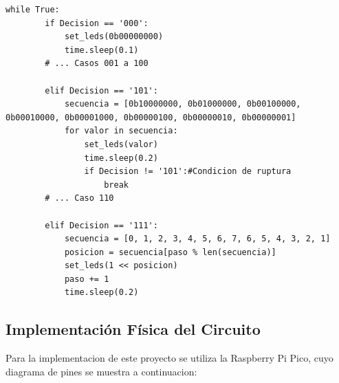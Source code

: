 \documentclass[letterpaper,12pt]{article}
\begin{document}
    \begin{lstlisting}[language={[LAB]Python}, caption={Lógica de control del ciclo principal y casos principales de cada categoría}]
    while True:
        if Decision == '000':
            set_leds(0b00000000)
            time.sleep(0.1)
        # ... Casos 001 a 100
                
        elif Decision == '101':
            secuencia = [0b10000000, 0b01000000, 0b00100000, 0b00010000, 0b00001000, 0b00000100, 0b00000010, 0b00000001]
            for valor in secuencia:
                set_leds(valor)
                time.sleep(0.2)
                if Decision != '101':#Condicion de ruptura
                    break
        # ... Caso 110
                
        elif Decision == '111':
            secuencia = [0, 1, 2, 3, 4, 5, 6, 7, 6, 5, 4, 3, 2, 1]
            posicion = secuencia[paso % len(secuencia)]
            set_leds(1 << posicion)
            paso += 1
            time.sleep(0.2)
    \end{lstlisting}


    \subsection{Implementación Física del Circuito}
    Para la implementacion de este proyecto se utiliza la Raspberry Pi Pico, cuyo diagrama de pines se muestra a continuacion:
\end{document}
